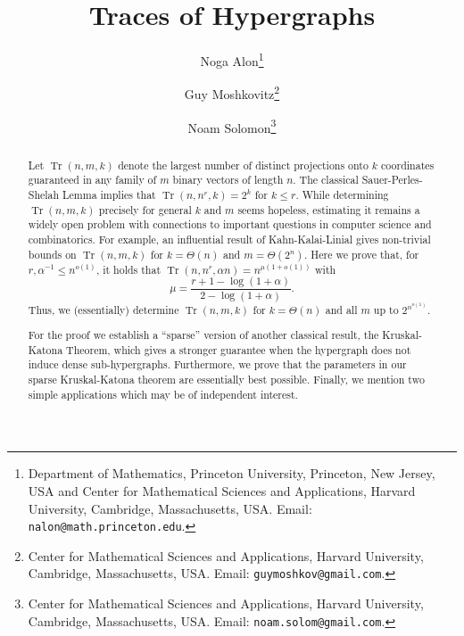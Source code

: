 \documentclass[11pt]{article}
\date{}
\title{Traces of Hypergraphs}
\author{
Noga Alon\thanks{Department of Mathematics, Princeton University, 
Princeton, New Jersey, USA and
Center for Mathematical Sciences and Applications, 
Harvard University, Cambridge, Massachusetts, USA.
Email: \texttt{nalon@math.princeton.edu}.}
\and
Guy Moshkovitz\thanks{Center for Mathematical Sciences and Applications, Harvard University, Cambridge, Massachusetts, USA. Email: \texttt{guymoshkov@gmail.com}.}
\and
Noam Solomon\thanks{Center for Mathematical Sciences and Applications, Harvard University, Cambridge, Massachusetts, USA. Email: \texttt{noam.solom@gmail.com}.}
}
\newcommand{\floor}[1]{\left\lfloor{#1}\right\rfloor}
\renewcommand{\a}{\alpha}
\newcommand{\C}{\mu}
\DeclareMathOperator{\trace}{Tr}
\begin{document}
\maketitle

%

\begin {abstract} 
Let $\trace(n,m,k)$ denote the largest number of distinct projections onto $k$ coordinates guaranteed in any family of $m$ binary vectors of length $n$.
The classical Sauer-Perles-Shelah Lemma implies that $\trace(n, n^r, k) = 2^k$ for $k \le r$.
While determining $\trace(n,m,k)$ precisely for general $k$ and $m$ seems
hopeless, estimating it remains a widely open problem with connections to 
important questions in computer science and combinatorics.
For example, an influential result of Kahn-Kalai-Linial gives non-trivial bounds on	 $\trace(n, m, k)$ for $k=\Theta(n)$ and $m = \Theta(2^n)$.
Here we prove that, for $r,\a^{-1} \le n^{o(1)}$, it holds that
$\trace(n,n^r,\a n) = n^{\C(1+o(1))}$ with $$\C=\frac{r+1-\log(1+\a)}{2-\log(1+\a)}.$$
Thus, we (essentially) determine $\trace(n,m,k)$ for $k=\Theta(n)$ and all $m$ up to $2^{n^{o(1)}}$.


For the proof we establish a ``sparse'' version of another 
classical result, the Kruskal-Katona Theorem, 
which gives a stronger guarantee when the hypergraph does not 
induce dense sub-hypergraphs.
Furthermore, we prove that the parameters in our sparse Kruskal-Katona 
theorem are essentially best possible. 
Finally, we mention two simple applications which may be 
of independent interest. 
\end {abstract}
\end{document}
